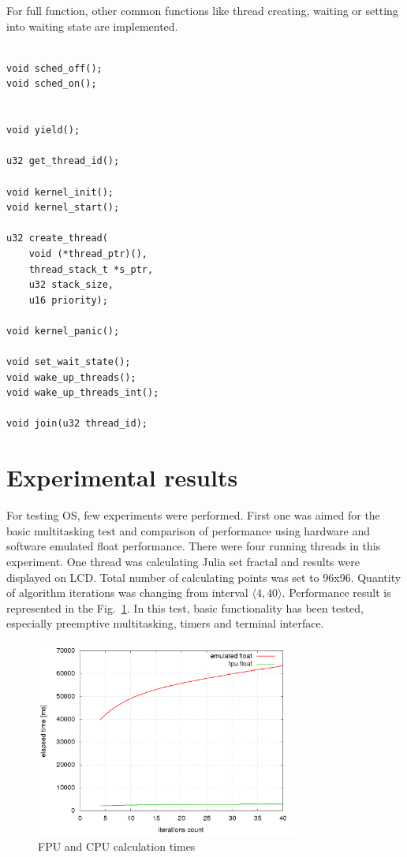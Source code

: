 \documentclass[a4paper, conference]{IEEEtran}
\begin{document}
For full function, other common functions like thread creating, waiting or setting into waiting state are implemented.

\noindent\begin{minipage}{.45\textwidth}
\lstset{language=C++}    
\begin{lstlisting}[frame=single, caption = kernel functions]

void sched_off();
void sched_on();


void yield();

u32 get_thread_id();

void kernel_init();
void kernel_start();

u32 create_thread(
	void (*thread_ptr)(), 
	thread_stack_t *s_ptr, 
	u32 stack_size, 
	u16 priority);	

void kernel_panic();

void set_wait_state();
void wake_up_threads();
void wake_up_threads_int();

void join(u32 thread_id);

\end{lstlisting}
\end{minipage}\hfill



\section{Experimental results}

For testing OS, few experiments were performed. First one was aimed for the basic multitasking test and comparison of performance using hardware and software emulated float performance.
There were four running threads in this experiment. One thread was calculating Julia set fractal and results were displayed on LCD. Total number of calculating points was set to 96x96.
Quantity of algorithm iterations was changing from interval $\langle 4, 40 \rangle$. Performance result is represented in the Fig.~\ref{fig_fpu_cpu}. In this test, basic functionality has been tested, especially preemptive multitasking, timers and terminal interface. 

\begin{figure}[]
\centering
\includegraphics[width=3.4in]{fpu_cpu_performance.png}
\caption{FPU and CPU calculation times}
\label{fig_fpu_cpu}
\end{figure}
\end{document}
